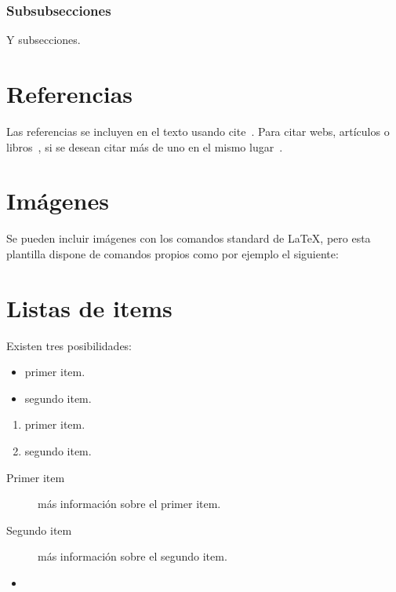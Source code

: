 \subsubsection{Subsubsecciones}

Y subsecciones. 


\section{Referencias}

Las referencias se incluyen en el texto usando cite~\cite{wiki:latex}. Para citar webs, artículos o libros~\cite{koza92}, si se desean citar más de uno en el mismo lugar~\cite{bortolot2005, koza92}.


\section{Imágenes}

Se pueden incluir imágenes con los comandos standard de \LaTeX, pero esta plantilla dispone de comandos propios como por ejemplo el siguiente:




\section{Listas de items}

Existen tres posibilidades:

\begin{itemize}
	\item primer item.
	\item segundo item.
\end{itemize}

\begin{enumerate}
	\item primer item.
	\item segundo item.
\end{enumerate}

\begin{description}
	\item[Primer item] más información sobre el primer item.
	\item[Segundo item] más información sobre el segundo item.
\end{description}
	
\begin{itemize}
\item 
\end{itemize}

